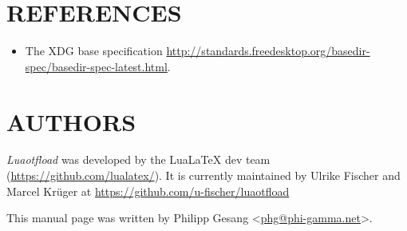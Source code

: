 \documentclass[a4paper]{article}
\begin{document}
\section{REFERENCES%
  \label{references}%
}

\begin{itemize}
\item The XDG base specification
\url{http://standards.freedesktop.org/basedir-spec/basedir-spec-latest.html}.
\end{itemize}


\section{AUTHORS%
  \label{authors}%
}

\emph{Luaotfload} was developed by the LuaLaTeX dev team
(\url{https://github.com/lualatex/}). It is currently maintained by Ulrike Fischer
and Marcel Krüger at \url{https://github.com/u-fischer/luaotfload}

This manual page was written by Philipp Gesang <\href{mailto:phg@phi-gamma.net}{phg@phi-gamma.net}>.
\end{document}
